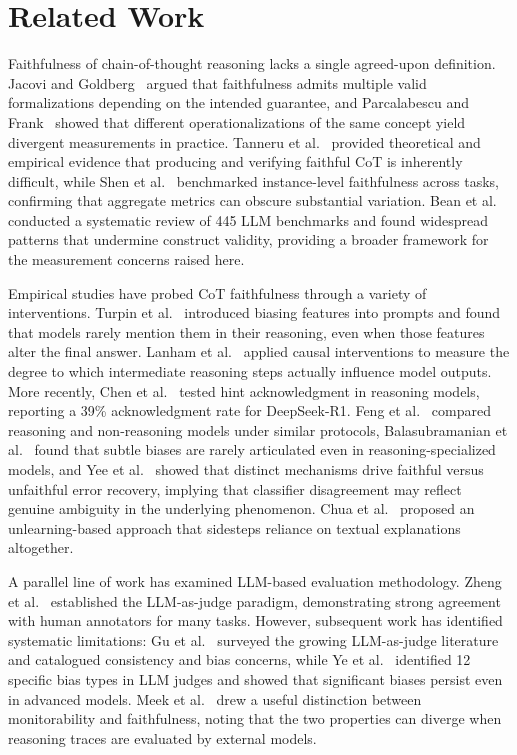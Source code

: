 \section{Related Work}

Faithfulness of chain-of-thought reasoning lacks a single agreed-upon definition. Jacovi and Goldberg~\cite{jacovi2020faithfulness} argued that faithfulness admits multiple valid formalizations depending on the intended guarantee, and Parcalabescu and Frank~\cite{parcalabescu2023measuring} showed that different operationalizations of the same concept yield divergent measurements in practice. Tanneru et al.~\cite{tanneru2024hardness} provided theoretical and empirical evidence that producing and verifying faithful CoT is inherently difficult, while Shen et al.~\cite{shen2025faithcotbench} benchmarked instance-level faithfulness across tasks, confirming that aggregate metrics can obscure substantial variation. Bean et al.~\cite{bean2025measuring} conducted a systematic review of 445 LLM benchmarks and found widespread patterns that undermine construct validity, providing a broader framework for the measurement concerns raised here.

Empirical studies have probed CoT faithfulness through a variety of interventions. Turpin et al.~\cite{turpin2023unfaithful} introduced biasing features into prompts and found that models rarely mention them in their reasoning, even when those features alter the final answer. Lanham et al.~\cite{lanham2023measuring} applied causal interventions to measure the degree to which intermediate reasoning steps actually influence model outputs. More recently, Chen et al.~\cite{chen2025reasoning} tested hint acknowledgment in reasoning models, reporting a 39\% acknowledgment rate for DeepSeek-R1. Feng et al.~\cite{feng2025more} compared reasoning and non-reasoning models under similar protocols, Balasubramanian et al.~\cite{balasubramanian2025closer} found that subtle biases are rarely articulated even in reasoning-specialized models, and Yee et al.~\cite{yee2024dissociation} showed that distinct mechanisms drive faithful versus unfaithful error recovery, implying that classifier disagreement may reflect genuine ambiguity in the underlying phenomenon. Chua et al.~\cite{chua2025unlearning} proposed an unlearning-based approach that sidesteps reliance on textual explanations altogether.

A parallel line of work has examined LLM-based evaluation methodology. Zheng et al.~\cite{zheng2023judging} established the LLM-as-judge paradigm, demonstrating strong agreement with human annotators for many tasks. However, subsequent work has identified systematic limitations: Gu et al.~\cite{gu2024survey} surveyed the growing LLM-as-judge literature and catalogued consistency and bias concerns, while Ye et al.~\cite{ye2024justice} identified 12 specific bias types in LLM judges and showed that significant biases persist even in advanced models. Meek et al.~\cite{meek2025monitorability} drew a useful distinction between monitorability and faithfulness, noting that the two properties can diverge when reasoning traces are evaluated by external models.

